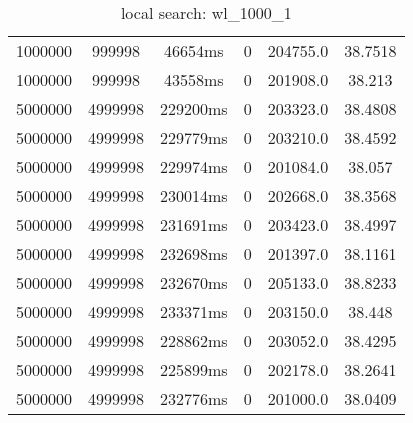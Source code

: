 \documentclass[./main.tex]{subfiles}
\begin{document}
\begin{table}
\begin{tabular}{ c | c | c | c | c | c }
        1000000 & 999998 & 46654ms & 0 & 204755.0 & 38.7518 \\
        1000000 & 999998 & 43558ms & 0 & 201908.0 & 38.213 \\
        \hline
        5000000 & 4999998 & 229200ms & 0 & 203323.0 & 38.4808 \\
        5000000 & 4999998 & 229779ms & 0 & 203210.0 & 38.4592 \\
        5000000 & 4999998 & 229974ms & 0 & 201084.0 & 38.057 \\
        5000000 & 4999998 & 230014ms & 0 & 202668.0 & 38.3568 \\
        5000000 & 4999998 & 231691ms & 0 & 203423.0 & 38.4997 \\
        5000000 & 4999998 & 232698ms & 0 & 201397.0 & 38.1161 \\
        5000000 & 4999998 & 232670ms & 0 & 205133.0 & 38.8233 \\
        5000000 & 4999998 & 233371ms & 0 & 203150.0 & 38.448 \\
        \rowcolor{lightgray} 5000000 & 4999998 & 228862ms & 0 & 203052.0 & 38.4295 \\
        5000000 & 4999998 & 225899ms & 0 & 202178.0 & 38.2641 \\
        5000000 & 4999998 & 232776ms & 0 & 201000.0 & 38.0409 \\
    \end{tabular}
    \caption{local search: wl\_1000\_1}
\end{table}
\end{document}
